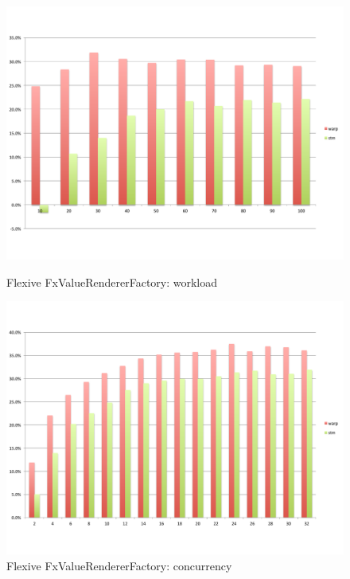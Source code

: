 \begin{figure}
\begin{minipage}{0.45 \textwidth}
		\includegraphics[width=\textwidth]{../../eval/32threads/case3it.pdf}
		\caption{\label{Fi:case3it}Flexive {\sf FxValueRendererFactory}: workload}
	\end{minipage}
	\hspace{0.1 \textwidth}
	\begin{minipage}{0.45 \textwidth}
		\includegraphics[width=\textwidth]{../../eval/32threads/case3th.pdf}
		\caption{\label{Fi:case3th}Flexive {\sf FxValueRendererFactory}: concurrency}
	\end{minipage}
	\begin{minipage}{0.45 \textwidth}

\end{minipage}
\end{figure}
